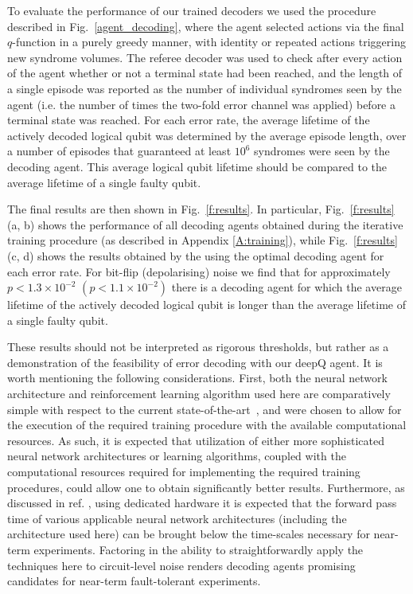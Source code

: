 \documentclass[twocolumn,preprintnumbers,amsmath,amssymb,notitlepage,nofootinbib,longbibliography,superscriptaddress,aps,pra,10pt]{revtex4-1}
\begin{document}
	To evaluate the performance of our trained decoders we used the procedure described in Fig.~\ref{agent_decoding}, where the agent selected actions via the
	final $q$-function in a purely greedy manner, with identity or repeated actions triggering new syndrome volumes.
	The referee decoder was used to check after every action of the agent whether or not a terminal state had been reached, and the length of a single episode was reported
	as the number of individual syndromes seen by the agent (i.e. the number of times the two-fold error channel was applied) before a terminal state was reached.
	For each error rate, the average lifetime of the actively decoded logical qubit was determined by the average episode length, over a number of episodes that guaranteed
	at least $10^6$ syndromes were seen by the decoding agent. This average logical qubit lifetime should be compared to the average lifetime of a single faulty qubit.

	The final results are then shown in Fig.\ \ref{f:results}.
	In particular, Fig.\ \ref{f:results} (a, b) shows the performance of all decoding agents obtained during the iterative training procedure
	(as described in Appendix \ref{A:training}), while Fig.\ \ref{f:results} (c, d) shows the results obtained by the using the optimal decoding agent for each error rate.
	For bit-flip (depolarising) noise we find that for approximately $p < 1.3\times 10^{-2}$  $(p < 1.1\times 10^{-2})$ there is a decoding agent for which the
	average lifetime of the actively decoded logical qubit is longer than the average lifetime of a single faulty qubit.

	These results should not be interpreted as rigorous thresholds, but rather as a demonstration of the feasibility of error decoding with our deepQ agent.
	It is worth mentioning the following considerations.
	First, both the neural network architecture and reinforcement learning algorithm used here are comparatively simple with respect to the current state-of-the-art~\cite{RLmnih2016asynchronous,RLSilver17b,RLsilver2017mastering,RLSilver2016},
	and were chosen to allow for the execution of the required training procedure with the available computational resources.
	As such, it is expected that utilization of either more sophisticated neural network architectures or learning algorithms, coupled with the computational resources required for implementing the required
	training procedures, could allow one to obtain significantly better results.
	Furthermore, as discussed in ref. \cite{chamberland2018deep}, using dedicated hardware it is expected that the forward pass time of various applicable neural network architectures
	(including the architecture used here) can be brought below the time-scales necessary for near-term experiments.
	Factoring in the ability to straightforwardly apply the techniques here to circuit-level noise renders decoding agents promising candidates for near-term fault-tolerant experiments.
\end{document}
